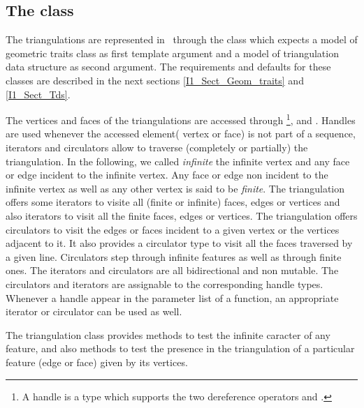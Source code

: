 \subsection{The class \protect {}}

The triangulations are represented in \cgal\ through the class
which  expects a model of  {geometric traits} class
as first template argument and a model of {triangulation data structure}
as second argument. The requirements  and defaults for these classes 
are described in the next sections \ref{I1_Sect_Geom_traits}
and \ref{I1_Sect_Tds}.


The vertices and faces of the triangulations are accessed through 
\footnote{ A handle is a type which supports the two
dereference operators  and .}, 
 and . 
Handles are used whenever the accessed element( vertex or face)
is not part of a sequence,
iterators and circulators
allow to traverse (completely or partially) the triangulation.
 In the following, we called {\it infinite}  the infinite vertex
and any face or edge 
incident  to the infinite vertex. Any face or edge non incident
to the infinite vertex as well as any other vertex
  is said 
to be {\it finite}.
The triangulation offers some iterators to visite all (finite or infinite)
faces, edges or vertices and also iterators to visit all the finite
faces, edges  or vertices.
The triangulation offers circulators  
 to visit the edges or faces 
incident to a given vertex or the  vertices 
adjacent to it. It also provides a circulator type
to visit all the
faces
traversed by a given line.
Circulators step through infinite features as well as 
through finite ones. 
The iterators and circulators
are all bidirectional and non mutable.
The circulators and iterators are assignable to the 
corresponding handle types. Whenever a handle appear in the parameter 
list of a function, an appropriate iterator or circulator can be used as well.


The triangulation class provides methods to test
the infinite caracter of any feature,
and also methods to test the presence in the triangulation
of a particular feature (edge or face) given by its vertices.



